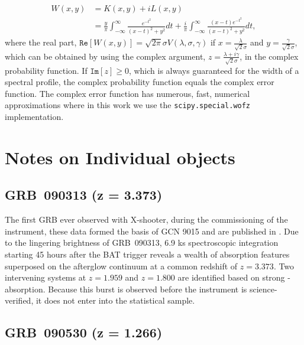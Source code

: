\documentclass[longauth]{aa}    %
\begin{document}
\begin{equation} 
\begin{split}
W(x, y)  
& = K(x, y) + i L(x, y) \\
& = \frac{y}{\pi}  \int_{-\infty}^{\infty} \frac{e^{- t^2 }}{(x -  t)^2 +y^2} dt  + \frac{i}{\pi}  \int_{-\infty}^{\infty} \frac{(x - t)e^{- t^2 }}{(x -  t)^2 +y^2} dt,
\end{split}
\end{equation}
where the real part, $\mathtt{Re}[W(x, y)] =  \sqrt{2 \pi} \sigma
V(\lambda,\sigma, \gamma)$ if $x = \frac{\lambda}{\sqrt{2} \sigma}$ and $y =
\frac{\gamma}{\sqrt{2} \sigma}$, which can be obtained by using the complex
argument, $z = \frac{\lambda + i\gamma}{\sqrt{2} \sigma}$, in the complex
probability function. If $\mathtt{Im}[z] \geq 0$, which is always guaranteed for
the width of a spectral profile, the complex probability function equals the
complex error function. The complex error function has numerous, fast, numerical
approximations where in this work we use the \texttt{scipy.special.wofz}
\citep{scipy} implementation.


\section{Notes on Individual objects} \label{notes}

\subsection{GRB~090313 (z = 3.373)} \label{090313}

The first GRB ever observed with X-shooter, during the commissioning of the
instrument, these data formed the basis of GCN 9015 \citep{GCN.9015} and are
published in \citet{DeUgartePostigo2010}. Due to the lingering brightness of
GRB~090313, 6.9 ks spectroscopic integration starting 45 hours after the BAT
trigger reveals a wealth of absorption features superposed on the afterglow
continuum at a common redshift of $z = 3.373$. Two intervening systems at $z =
1.959$ and $z = 1.800$ are identified based on strong \mgii-absorption. Because
this burst is observed before the instrument is science-verified, it does not
enter into the statistical sample.

\subsection{GRB~090530 (z = 1.266)}\label{090530}
\end{document}
